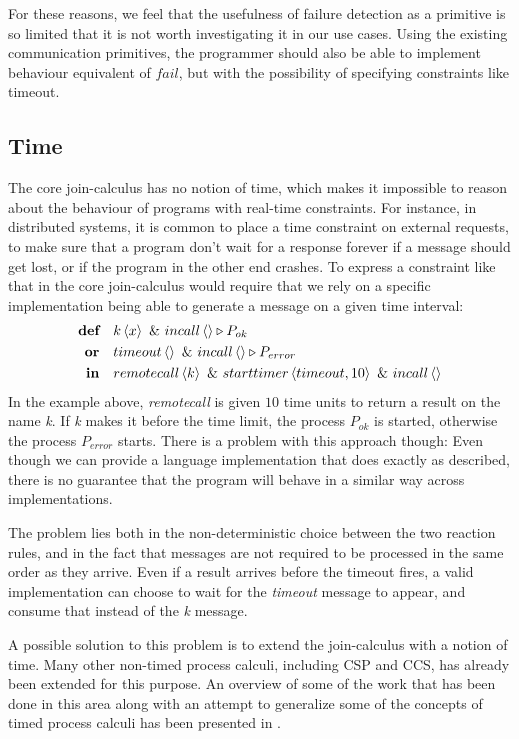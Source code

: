 For these reasons, we feel that the usefulness of failure detection as a
primitive is so limited that it is not worth investigating it in our use cases.
Using the existing communication primitives, the programmer should also be able
to implement behaviour equivalent of $fail$, but with the possibility of
specifying constraints like timeout.

\subsection{Time}

The core join-calculus has no notion of time, which makes it
impossible to reason about the behaviour of programs with real-time
constraints.  For instance, in distributed systems, it is common to
place a time constraint on external requests, to make sure that a
program don't wait for a response forever if a message should get
lost, or if the program in the other end crashes. To express a
constraint like that in the core join-calculus would require that we
rely on a specific implementation being able to generate a message on
a given time interval:
\begin{align*}
  \textbf{def}\quad & \atm k<x> ~\&~ \atm incall<> \triangleright P_{ok} \\
  \mathbf{or}\quad & \atm timeout<> ~\&~ \atm incall<> \triangleright P_{error} \\
  \textbf{in}\quad & \atm remotecall<k> ~\&~ \atm starttimer<timeout, 10>
                                      ~\&~ \atm incall<>
\end{align*}
In the example above, \emph{remotecall} is given $10$ time units to
return a result on the name \emph{k}. If \emph{k} makes it before the
time limit, the process $P_{ok}$ is started, otherwise the process
$P_{error}$ starts.  There is a problem with this approach though:
Even though we can provide a language implementation that does exactly as
described, there is no guarantee that the program will behave in a similar way
across implementations.

The problem lies both in the non-deterministic choice between the two
reaction rules, and in the fact that messages are not required to be
processed in the same order as they arrive. Even if a result arrives
before the timeout fires, a valid implementation can choose to wait
for the \emph{timeout} message to appear, and consume that instead of
the \emph{k} message.

A possible solution to this problem is to extend the join-calculus
with a notion of time. Many other non-timed process calculi, including
CSP and CCS, has already been extended for this purpose. An overview
of some of the work that has been done in this area along with an
attempt to generalize some of the concepts of timed process calculi
has been presented in \cite{nicollin-overview}.

